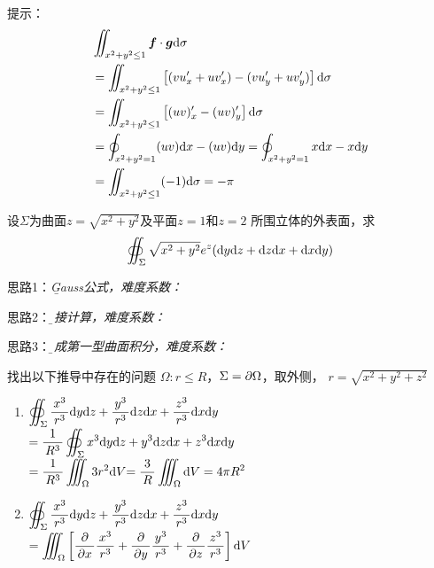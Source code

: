 \begin{frame}
	\linespread{1.2}
		
	\alert{提示：}
	{\it\b
	\begin{align}
		&\iint_{x^2+y^2\leq 1}\bm{f}\cdot\bm{g}\mathrm{d}\sigma\notag\\
		&=\iint_{x^2+y^2\leq 1}\left[(vu'_x+uv'_x)-
		(vu'_y+uv'_y)\right]\mathrm{d}\sigma\notag\\
		&=\iint_{x^2+y^2\leq 1}\left[(uv)'_x-(uv)'_y\right]
		\mathrm{d}\sigma\notag\\
		&=\oint_{x^2+y^2=1}(uv)\mathrm{d} x-(uv)\mathrm{d} y
		=\oint_{x^2+y^2=1}x\mathrm{d} x-x\mathrm{d} y\notag\\
		&=\iint_{x^2+y^2\leq 1}(-1)\mathrm{d}\sigma=-\pi\notag\\
	\end{align}
	}
\end{frame}

\begin{frame}
	\linespread{1.2}
	设$\Sigma$为曲面$z=\sqrt{x^2+y^2}$及平面$z=1$和$z=2$
	所围立体的外表面，求
	$$\oiint_{\Sigma}\sqrt{x^2+y^2}e^z(\mathrm{d} y\mathrm{d} z+\mathrm{d} z\mathrm{d} x+\mathrm{d} x\mathrm{d} y)$$
		
	\bigskip\pause	
	\alert{思路1：}{\it\b Gauss公式，难度系数：
	\FiveStar\FiveStar\FiveStar\FiveStar\FiveStar\pause}
	
	\alert{思路2：}{\it\b 直接计算，难度系数：
	\FiveStar\FiveStar\FiveStar\FiveStar\FiveStarOpen\pause}
	
	\alert{思路3：}{\it\b 化成第一型曲面积分，难度系数：
	\FiveStar\FiveStar\FiveStar\FiveStarOpen\FiveStarOpen}
\end{frame}

\begin{frame}
	\linespread{1.2}
	找出以下推导中存在的问题
	$\Omega:r\leq R$，$\Sigma=\partial\Omega$，取外侧，
	$r=\sqrt{x^2+y^2+z^2}$
	\begin{enumerate}[(1)]
	  \item
	  $\displaystyle\oiint_{\Sigma}\displaystyle\frac{\,{x^3}\,}{\,{r^3}\,}\mathrm{d}
	  y\mathrm{d} z+\displaystyle\frac{\,{y^3}\,}{\,{r^3}\,}\mathrm{d} z\mathrm{d} x+\displaystyle\frac{\,{z^3}\,}{\,{r^3}\,}\mathrm{d} x\mathrm{d} y$\\ 
	  \hspace{2cm}$=\displaystyle\frac{\,{1}\,}{\,{R^3}\,}\oiint_{\Sigma}x^3\mathrm{d} y\mathrm{d} z+y^3\mathrm{d} z\mathrm{d} x+z^3\mathrm{d} x\mathrm{d} y$\\ 
	  \hspace{2cm}$=\displaystyle\frac{\,{1}\,}{\,{R^3}\,}\iiint_{\Omega}3r^2\mathrm{d} V{=\displaystyle\frac{\,{3}\,}{\,{R}\,}\iiint_{\Omega}\mathrm{d} V} =4\pi R^2$\pause
	  \item
	  $\displaystyle\oiint_{\Sigma}\displaystyle\frac{\,{x^3}\,}{\,{r^3}\,}\mathrm{d}
	  y\mathrm{d} z+\displaystyle\frac{\,{y^3}\,}{\,{r^3}\,}\mathrm{d} z\mathrm{d} x+\displaystyle\frac{\,{z^3}\,}{\,{r^3}\,}\mathrm{d} x\mathrm{d} y$\\
	  \hspace{2cm}$=\displaystyle\iiint_{\Omega}\left[\displaystyle\frac{\,{\partial}\,}{\,{\partial x}\,}\displaystyle\frac{\,{x^3}\,}{\,{r^3}\,}+\displaystyle\frac{\,{\partial}\,}{\,{\partial
	  y}\,}\displaystyle\frac{\,{y^3}\,}{\,{r^3}\,}+\displaystyle\frac{\,{\partial}\,}{\,{\partial
	  z}\,}\displaystyle\frac{\,{z^3}\,}{\,{r^3}\,}\right]\mathrm{d} V$
	\end{enumerate}
\end{frame}

